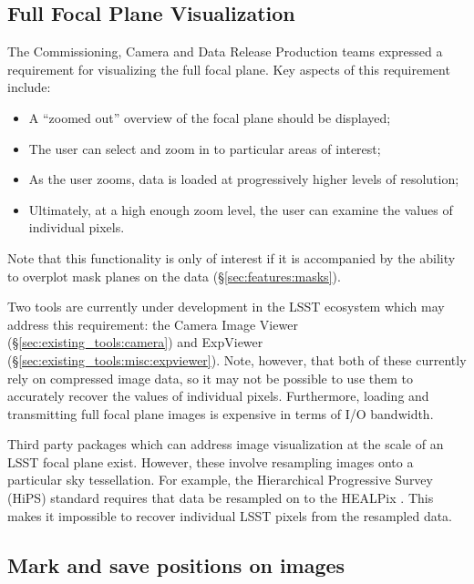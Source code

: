\subsection{Full Focal Plane Visualization}
\label{sec:features:focal_plane}

The Commissioning, Camera and Data Release Production teams expressed a requirement for visualizing the full focal plane.
Key aspects of this requirement include:

\begin{itemize}

  \item{A ``zoomed out'' overview of the focal plane should be displayed;}
  \item{The user can select and zoom in to particular areas of interest;}
  \item{As the user zooms, data is loaded at progressively higher levels of resolution;}
  \item{Ultimately, at a high enough zoom level, the user can examine the values of individual pixels.}

\end{itemize}

Note that this functionality is only of interest if it is accompanied by the ability to overplot mask planes on the data (\S\ref{sec:features:masks}).

Two tools are currently under development in the LSST ecosystem which may address this requirement: the Camera Image Viewer (\S\ref{sec:existing_tools:camera}) and ExpViewer (\S\ref{sec:existing_tools:misc:expviewer}).
Note, however, that both of these currently rely on compressed image data, so it may not be possible to use them to accurately recover the values of individual pixels.
Furthermore, loading and transmitting full focal plane images is expensive in terms of I/O bandwidth.

Third party packages which can address image visualization at the scale of an LSST focal plane exist.
However, these involve resampling images onto a particular sky tessellation.
For example, the Hierarchical Progressive Survey (HiPS) standard \citep{2017ivoa.spec.0519F} requires that data be resampled on to the HEALPix \citep{gor05}.
This makes it impossible to recover individual LSST pixels from the resampled data.

\subsection{Mark and save positions on images}

